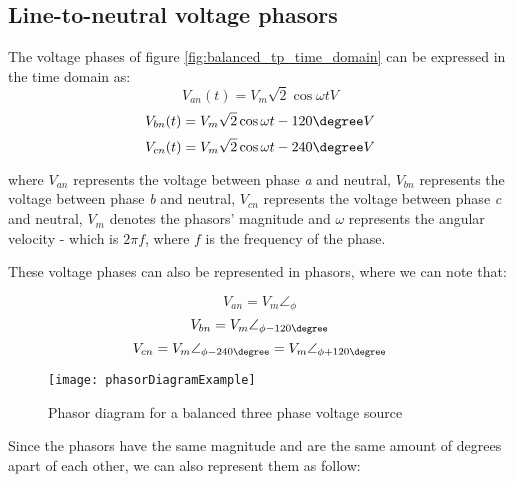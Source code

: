 \subsection{Line-to-neutral voltage phasors}

The voltage phases of figure \ref{fig:balanced_tp_time_domain} can be expressed in the time domain as:
\begin{equation} \label{eq:balanced_tpVan_timedomain}
	V_{an}(t) = V_{m}\sqrt{2}\cos{\omega t} V
\end{equation}
\begin{equation} \label{eq:balanced_tpVan_timedomain}
	V_{bn}(t) = V_{m}\sqrt{2}\cos{\omega t - 120\degree} V
\end{equation}
\begin{equation} \label{eq:balanced_tpVan_timedomain}
	V_{cn}(t) = V_{m}\sqrt{2}\cos{\omega t - 240\degree} V
\end{equation}

where $V_{an}$ represents the voltage between phase \emph{a} and neutral, $V_{bn}$ represents the voltage between phase \emph{b} and neutral, $V_{cn}$ represents the voltage between phase \emph{c} and neutral, $V_{m}$ denotes the phasors' magnitude and $\omega$ represents the angular velocity - which is $2\pi f$, where $f$ is the frequency of the phase. 

These voltage phases can also be represented in phasors, where we can note that:

\begin{equation} \label{eq:balanced_tpVan}
	V_{an} = V_{m}\angle_{\phi}
\end{equation}
\begin{equation} \label{eq:balanced_tpVbn}
	V_{bn} = V_{m}\angle_{\phi - 120\degree} 
\end{equation}
\begin{equation} \label{eq:balanced_tpVcn}
	V_{cn} = V_{m}\angle_{\phi - 240\degree} = V_{m}\angle_{\phi + 120\degree} 
\end{equation}

\begin{figure}[htbp]
	\centering
	\texttt{[image: phasorDiagramExample]}
	\caption{Phasor diagram for a balanced three phase voltage source}
	\label{fig:balanced_tp_phasor_domain}
\end{figure}

Since the phasors have the same magnitude and are the same amount of degrees apart of each other, we can also represent them as follow:

